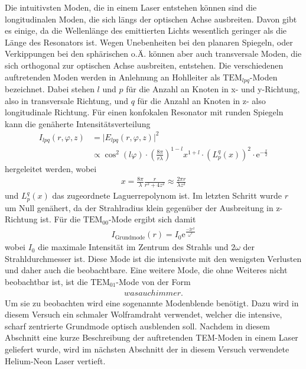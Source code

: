 Die intuitivsten Moden, die in einem Laser entstehen können sind die longitudinalen
Moden, die sich längs der optischen Achse ausbreiten. Davon gibt es einige, da die
Wellenlänge des emittierten Lichts wesentlich geringer als die Länge des Resonators ist.
Wegen Unebenheiten bei den planaren Spiegeln, oder Verkippungen bei den sphärischen o.Ä.
können aber auch transversale Moden, die sich orthogonal zur optischen Achse ausbreiten, entstehen.
Die verschiedenen auftretenden Moden werden in Anlehnung an Hohlleiter als $\text{TEM}_{lpq}$-Moden
bezeichnet. Dabei stehen $l$ und $p$ für die Anzahl an Knoten in x- und y-Richtung, also
in transversale Richtung, und $q$ für die Anzahl an Knoten in z- also longitudinale
Richtung. Für einen konfokalen Resonator mit runden Spiegeln kann die genäherte Intensitätsverteilung
\begin{align}
  I_{lpq}(r,\varphi,z) &= \lvert E_{lpq}(r,\varphi,z) \rvert^2 \\
  &\propto \cos^2\left(l \varphi\right) \cdot \left(\frac{8 \pi}{r \lambda}\right)^{1-l} x^{1+l} \cdot \left(L^q_p (x)\right)^2 \cdot \mathrm{e}^{-\frac{x}{2}}
\end{align}
hergeleitet werden, wobei
\begin{align}
  x = \frac{8 \pi}{\lambda} \frac{r}{r^2 + 4 z^2} \approx \frac{2 \pi r}{\lambda z^2}
\end{align}
und $L^q_p(x)$ das zugeordnete Laguerrepolynom ist. Im letzten Schritt wurde $r$ um Null genähert, da der Strahlradius klein
gegenüber der Ausbreitung in z-Richtung ist. Für die $\text{TEM}_{00}$-Mode ergibt sich damit
\begin{align}
  I_{\text{Grundmode}}(r) = I_0 \mathrm{e}^{\frac{-2 r^2}{\omega^2}}
\end{align}
wobei $I_0$ die maximale Intensität im Zentrum des Strahls und $2 \omega$ der Strahldurchmesser ist.
Diese Mode ist die intensivste mit den wenigsten Verlusten und daher auch die beobachtbare.
Eine weitere Mode, die ohne Weiteres nicht beobachtbar ist, ist die $\text{TEM}_{01}$-Mode
von der Form
\begin{align}
  was auch immer.
\end{align}
Um sie zu beobachten wird eine sogenannte Modenblende benötigt. Dazu wird in diesem Versuch ein
schmaler Wolframdraht verwendet, welcher die intensive, scharf zentrierte Grundmode optisch ausblenden soll.
Nachdem in diesem Abschnitt eine kurze Beschreibung der auftretenden TEM-Moden in einem Laser geliefert wurde,
wird im nächsten Abschnitt der in diesem Versuch verwendete Helium-Neon Laser vertieft.

